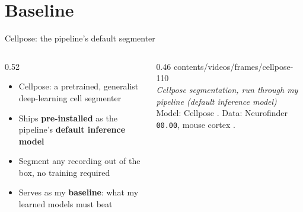 %
\section{Baseline}

\begin{frame}[t]{Cellpose: the pipeline's default segmenter}
\begin{columns}[c]
\begin{column}{0.52\textwidth}
\begin{itemize}
\item Cellpose: a pretrained, generalist deep-learning cell segmenter
      \cite{stringer2021cellpose}
\item Ships \textbf{pre-installed} as the pipeline's \textbf{default inference
      model}
\item Segment any recording out of the box, no training required
\item Serves as my \textbf{baseline}: what my learned models must beat
\end{itemize}
\end{column}
\hfill%
\begin{column}{0.46\textwidth}
\centering
%
{contents/videos/frames/cellpose-}{1}{10}\\[0.4em]
{\small\itshape Cellpose segmentation, run through my pipeline (default
 inference model)}\\[0.3em]
{\scriptsize Model: Cellpose \cite{stringer2021cellpose}. Data: Neurofinder
 \texttt{00.00}, mouse cortex \cite{peron2015barrel, neurofinder}.}
\end{column}
\end{columns}
\end{frame}

